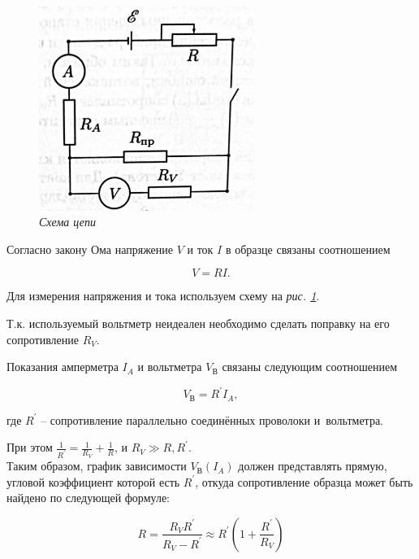\documentclass[a4paper,12pt]{article} %
\begin{document}
\medskip

\begin{figure}
	\includegraphics[width=7cm]{scheme.jpg}
	\caption{\textit{Схема цепи}}
	\label{fig:image}
\end{figure}

Согласно закону Ома напряжение $V$ и ток $I$ в образце связаны соотношением

\begin{equation}
V = RI.
\end{equation}

Для измерения напряжения и тока используем схему на \textit{рис.  \ref{fig:image}}.

\medskip

Т.к. используемый вольтметр неидеален необходимо сделать поправку на его сопротивление $R_V$.

\medskip

Показания амперметра $I_A$ и вольтметра $V_\text{В}$ связаны следующим соотношением

\begin{equation}
V_\text{В}=R^\prime I_A,
\end{equation}

\noindent где $R^\prime$ -- сопротивление параллельно соединённых проволоки и~вольтметра.

\medskip

При этом $\frac{1}{R^\prime} = \frac{1}{R_V} + \frac{1}{R}$, и $R_V \gg R, R^\prime$.\\

Таким образом, график зависимости $V_\text{В}\left(I_A\right)$ должен представлять прямую, угловой коэффициент которой есть $R^\prime$, откуда сопротивление образца может быть найдено по следующей формуле:

\begin{equation}\label{r_provoloki}
R = \dfrac{R_V R^\prime}{R_V - R^\prime} \approx R^\prime \left( 1 + \frac{R^\prime}{R_V} \right) 
\end{equation}
\end{document}

